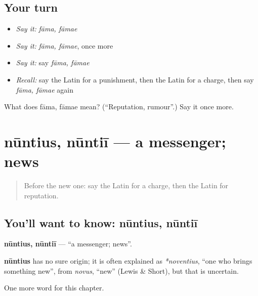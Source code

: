 \subsection*{Your turn}
\begin{itemize}
\raggedright
  \item \emph{Say it:} \emph{fāma, fāmae}
  \item \emph{Say it:} \emph{fāma, fāmae}, once more
  \item \emph{Say it:} say \emph{fāma, fāmae}
  \item \emph{Recall:} say the Latin for a punishment, then the Latin for a charge, then say \emph{fāma, fāmae} again
\end{itemize}

\begin{tcolorbox}[breakable,colback=teal!4,colframe=teal!35!black,title={Before you move on}]
What does fāma, fāmae mean? (\textquotedblleft{}Reputation, rumour\textquotedblright{}.) Say it once more.
\end{tcolorbox}
\section[nūntius, nūntiī]{nūntius, nūntiī — a messenger; news}

\label{lesson:LA-C219-nuntius}



\begin{quote}
Before the new one: say the Latin for a charge, then the Latin for reputation.
\end{quote}

\subsection*{You'll want to know: nūntius, nūntiī}
\textbf{nūntius, nūntiī} — \textquotedblleft{}a messenger; news\textquotedblright{}.

\begin{cousinweb}
\textbf{nūntius} has no sure origin; it is often explained as \emph{*noventius}, \textquotedblleft{}one who brings something new\textquotedblright{}, from \emph{novus}, \textquotedblleft{}new\textquotedblright{} (Lewis \& Short), but that is uncertain.
\end{cousinweb}

\begin{grammarlens}[title={What you've built}]
One more word for this chapter.
\end{grammarlens}

